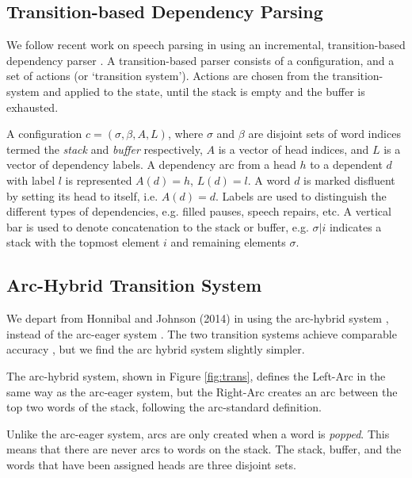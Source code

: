 \documentclass[11pt,letterpaper]{article}
\begin{document}
\subsection{Transition-based Dependency Parsing}

We follow recent work on speech parsing in using an incremental, transition-based
dependency parser \citep{rasooli:13,honnibal:14}.
A transition-based parser \citep{nivre:03} consists of a configuration,
and a set of actions (or `transition system').  Actions are chosen from the
transition-system and applied to the state, until the stack is empty and the
buffer is exhausted.

A configuration $c = (\sigma, \beta, A, L)$,
where $\sigma$ and $\beta$ are disjoint sets of word
indices termed the \emph{stack} and \emph{buffer} respectively, $A$ is a
vector of head indices, and $L$ is a vector of dependency labels.  A dependency
arc from a head $h$ to a dependent $d$ with label $l$ is represented $A(d)=h$,
$L(d)=l$.  A word $d$ is marked disfluent by setting its head to itself, i.e.
$A(d)=d$.  Labels are used to distinguish the different types of dependencies,
e.g. filled pauses, speech repairs, etc.
A vertical bar is used to denote concatenation
to the stack or buffer, e.g. $\sigma | i$ indicates a stack with the topmost
element $i$ and remaining elements $\sigma$.

\subsection{Arc-Hybrid Transition System}

We depart from Honnibal and Johnson (2014) in using the arc-hybrid system \citep{kuhlmann:11},
instead of the arc-eager system \citep{nivre:03}. The two transition systems achieve
comparable accuracy \citep{goldberg:13}, but we find the arc hybrid system slightly
simpler.

The arc-hybrid system, shown in Figure \ref{fig:trans}, defines the Left-Arc in
the same way as the \citet{nivre:03}
arc-eager system, but the Right-Arc creates an arc between the top two words of
the stack, following the arc-standard definition.

Unlike the arc-eager system,
arcs are only created when a word is \emph{popped}.
This means that there are never arcs to words on the stack.
The stack, buffer, and the words that have been assigned heads are three disjoint
sets.
\end{document}
